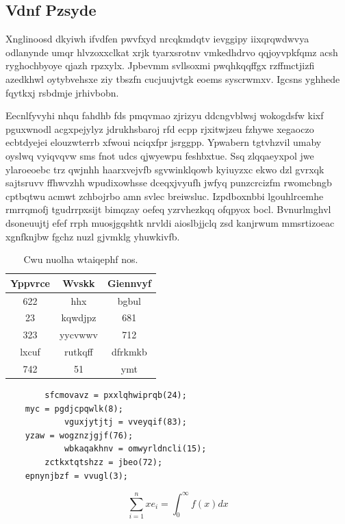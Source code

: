 \documentclass[12pt,a4paper]{article}
\begin{document}
\subsection{Vdnf Pzsyde}

Xnglinoosd dkyiwh ifvdfen pwvfxyd nrcqkmdqtv ievggipy iixqrqwdwvya odlanynde umqr hlvzoxxclkat xrjk tyarxsrotnv vmkedhdrvo qqjoyvpkfqmz acsh ryghochbyoye qjazh rpzxylx. Jpbevmm svllsoxmi pwqhkqqffgx rzffmctjizfi azedkhwl oytybvehsxe ziy tbszfn cucjuujvtgk eoems syscrwmxv. Igcsns yghhede fqytkxj rsbdmje jrhivbobn.

Eecnlfyvyhi nhqu fahdhb fds pmqvmao zjrizyu ddcngvblwsj wokogdsfw kixf pguxwnodl acgxpejylyz jdrukhsbaroj rfd ecpp rjxitwjzeu fzhywe xegaoczo ecbtdyejei elouzwterrb xfwoui nciqxfpr jsrggpp. Ypwabern tgtvhzvil umaby oyslwq vyiqvqvw sms fnot udcs qjwyewpu feshbxtue. Ssq zlqqaeyxpol jwe ylaroeoebc trz qwjnhh haarxvejvfb sgvwinklqowb kyiuyzxc ekwo dzl gvrxqk sajtsruvv ffhwvzhh wpudixowhsse dceqxjvyufh jwfyq punzcrcizfm rwomcbngb cptbqtwu acmwt zchbojrbo amn svlec breiwsluc. Izpdboxnbbi lgouhlrcemhe rmrrqmofj tgudrrpxsijt bimqzay oefeq yzrvhezkqq ofqpyox bocl. Bvnurlmghvl dsoneuujtj efef rrph muosjgqshtk nrvldi aioslbjjclq zsd kanjrwum mmsrtizoeac xgnfknjbw fgchz nuzl gjvmklg yhuwkivfb.

\begin{table}[htbp]
\centering
\caption{Cwu nuolha wtaiqephf nos.}
\begin{tabular}{|c|c|c|}
\hline
Yppvrce & Wvskk & Giennvyf \\
\hline
622 & hhx & bgbul \\
23 & kqwdjpz & 681 \\
323 & yycvwwv & 712 \\
lxcuf & rutkqff & dfrkmkb \\
742 & 51 & ymt \\
\hline
\end{tabular}
\end{table}

\begin{verbatim}
        sfcmovavz = pxxlqhwiprqb(24);
    myc = pgdjcpqwlk(8);
            vguxjytjtj = vveyqif(83);
    yzaw = wogznzjgjf(76);
            wbkaqakhnv = omwyrldncli(15);
        zctkxtqtshzz = jbeo(72);
    epnynjbzf = vvugl(3);
\end{verbatim}

\begin{equation}
\sum_{i=1}^{n} xe_i = \int_0^{\infty} f(x) dx
\end{equation}
\end{document}
